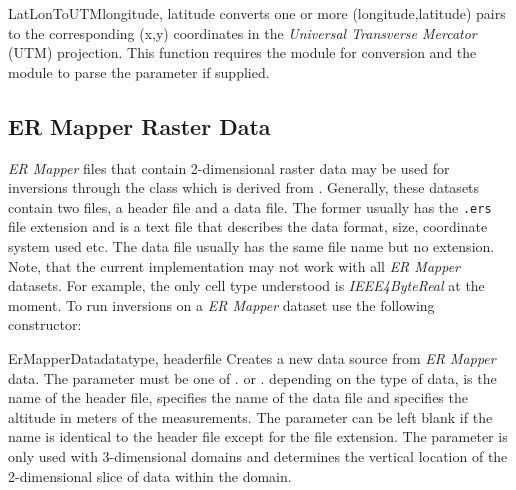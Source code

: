 \begin{funcdesc}{LatLonToUTM}{longitude, latitude%
}
converts one or more (longitude,latitude) pairs to the corresponding (x,y)
coordinates in the \emph{Universal Transverse Mercator} (UTM) projection.
This function requires the  module for conversion and the
 module to parse the  parameter if supplied.
\end{funcdesc}

\subsection{ER Mapper Raster Data}
\emph{ER Mapper} files that contain 2-dimensional raster data may be used for
inversions through the  class which is derived from
.
Generally, these datasets contain two files, a header file and a data file.
The former usually has the \texttt{.ers} file extension and is a text file that
describes the data format, size, coordinate system used etc.
The data file usually has the same file name but no extension.
Note, that the current implementation may not work with all \emph{ER Mapper}
datasets. For example, the only cell type understood is \emph{IEEE4ByteReal}
at the moment.
To run inversions on a \emph{ER Mapper} dataset use the following constructor:
\begin{classdesc}{ErMapperData}{datatype, headerfile%
%
}
Creates a new data source from \emph{ER Mapper} data.
The parameter  must be one of
. or .
depending on the type of data,  is the name of the header
file,  specifies the name of the data file and
 specifies the altitude in meters of the measurements.
The parameter  can be left blank if the name is identical to
the header file except for the file extension. The  parameter
is only used with 3-dimensional domains and determines the vertical location
of the 2-dimensional slice of data within the domain.
\end{classdesc}

